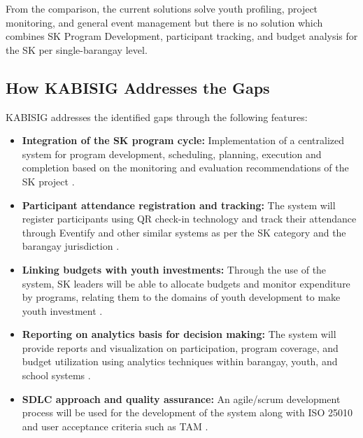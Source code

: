 \hspace*{\parindent}From the comparison, the current solutions solve youth profiling, project monitoring, and general event management but there is no solution which combines SK Program Development, participant tracking, and budget analysis for the SK per single-barangay level.
\vspace{5mm}


\subsection{How KABISIG Addresses the Gaps}

\hspace*{\parindent}KABISIG addresses the identified gaps through the following features:
\vspace{5mm}

\begin{itemize}
    \item \textbf{Integration of the SK program cycle:} Implementation of a centralized system for program development, scheduling, planning, execution and completion based on the monitoring and evaluation recommendations of the SK project \cite{J,AB,AP,AR}.
    \item \textbf{Participant attendance registration and tracking:} The system will register participants using QR check-in technology and track their attendance through Eventify \cite{A} and other similar systems as per the SK category and the barangay jurisdiction \cite{L,AP,E}.
    \item \textbf{Linking budgets with youth investments:} Through the use of the system, SK leaders will be able to allocate budgets and monitor expenditure by programs, relating them to the domains of youth development to make youth investment \cite{S,AB,AP,AR}.
    \item \textbf{Reporting on analytics basis for decision making:} The system will provide reports and visualization on participation, program coverage, and budget utilization using analytics techniques within barangay, youth, and school systems \cite{A,C,D,E,AM,AS}.
    \item \textbf{SDLC approach and quality assurance:} An agile/scrum development process will be used for the development of the system along with ISO 25010 and user acceptance criteria such as TAM \cite{A,C,D,E,W,Z,AM,AS}.
\end{itemize}
\vspace{5mm}